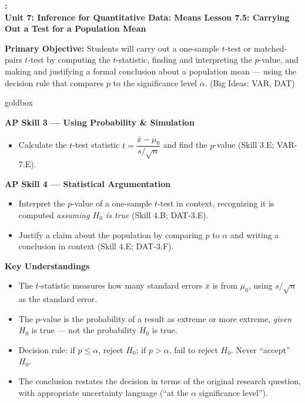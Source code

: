 \documentclass[10pt]{article}
\newcommand{\UnitNumberName}{Unit 7: Inference for Quantitative Data: Means \quad}
\newcommand{\LessonNumberName}{Lesson 7.5: Carrying Out a Test for a Population Mean}
\begin{document}
\begin{center}
    {\Large\bfseries \CourseName: \SchoolYear \\
    {\small\bfseries \UnitNumberName \LessonNumberName}}
\end{center}

\begin{tcolorbox}[colback=sky, colframe=navy, boxrule=0.9pt, arc=2mm,
    left=2mm, right=2mm, top=1.5mm, bottom=1.5mm]
    \textbf{Primary Objective:} Students will carry out a one-sample $t$-test or
    matched-pairs $t$-test by computing the $t$-statistic, finding and interpreting the
    $p$-value, and making and justifying a formal conclusion about a population mean ---
    using the decision rule that compares $p$ to the significance level $\alpha$.
    (Big Ideas: VAR, DAT)
\end{tcolorbox}

\renewcommand{\arraystretch}{1.6}
\begin{skillbox}{goldbox}
\begin{minipage}[t]{0.48\linewidth}
    \textbf{AP Skill 3 --- Using Probability \& Simulation}
    \begin{itemize}
        \item Calculate the $t$-test statistic $t = \dfrac{\bar x - \mu_0}{s/\sqrt{n}}$
              and find the $p$-value (Skill 3.E; VAR-7.E).
    \end{itemize}
    \textbf{AP Skill 4 --- Statistical Argumentation}
    \begin{itemize}
        \item Interpret the $p$-value of a one-sample $t$-test in context, recognizing
              it is computed \emph{assuming $H_0$ is true} (Skill 4.B; DAT-3.E).
        \item Justify a claim about the population by comparing $p$ to $\alpha$ and
              writing a conclusion in context (Skill 4.E; DAT-3.F).
    \end{itemize}
\end{minipage}
\hfill
\begin{minipage}[t]{0.48\linewidth}
    \textbf{Key Understandings}
    \begin{itemize}
        \item The $t$-statistic measures how many standard errors $\bar x$ is from $\mu_0$,
              using $s/\sqrt{n}$ as the standard error.
        \item The $p$-value is the probability of a result as extreme or more extreme,
              \emph{given} $H_0$ is true --- not the probability $H_0$ is true.
        \item Decision rule: if $p \le \alpha$, reject $H_0$; if $p > \alpha$, fail to
              reject $H_0$. Never ``accept'' $H_0$.
        \item The conclusion restates the decision in terms of the original research question,
              with appropriate uncertainty language (``at the $\alpha$ significance level'').
    \end{itemize}
\end{minipage}
\end{skillbox}
\end{document}

